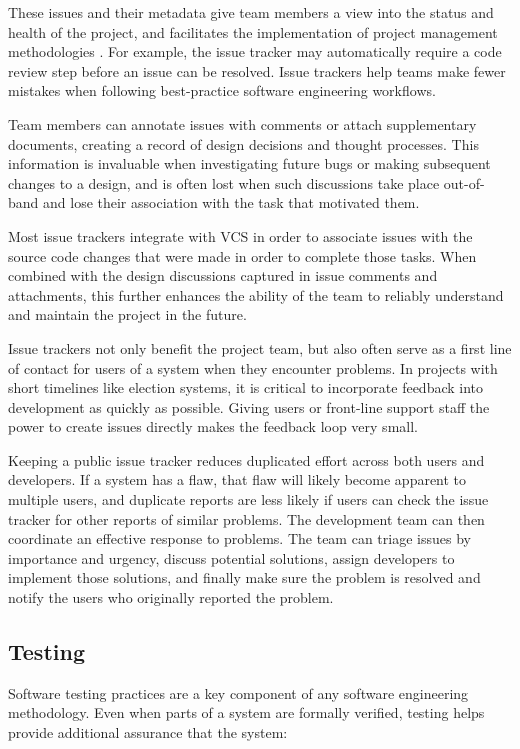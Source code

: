 These issues and their metadata give team members a view into the
status and health of the project, and facilitates the implementation
of project management methodologies . For example, the issue tracker may automatically require a
code review step before an issue can be resolved. Issue trackers help
teams make fewer mistakes when following best-practice software
engineering workflows.

Team members can annotate issues with comments or attach supplementary
documents, creating a record of design decisions and thought
processes. This information is invaluable when investigating future
bugs or making subsequent changes to a design, and is often lost when
such discussions take place out-of-band and lose their association
with the task that motivated them.

Most issue trackers integrate with VCS in order to associate issues
with the source code changes that were made in order to complete those
tasks. When combined with the design discussions captured in issue
comments and attachments, this further enhances the ability of the
team to reliably understand and maintain the project in the future.

Issue trackers not only benefit the project team, but also often serve
as a first line of contact for users of a system when they encounter
problems. In projects with short timelines like election systems, it
is critical to incorporate feedback into development as quickly as
possible. Giving users or front-line support staff the power to create
issues directly makes the feedback loop very small.

Keeping a public issue tracker reduces duplicated effort across both
users and developers. If a system has a flaw, that flaw will likely
become apparent to multiple users, and duplicate reports are less
likely if users can check the issue tracker for other reports of
similar problems. The development team can then coordinate an
effective response to problems. The team can triage issues by
importance and urgency, discuss potential solutions, assign developers
to implement those solutions, and finally make sure the problem is
resolved and notify the users who originally reported the problem.

\subsection{Testing}

Software testing practices are a key component of any software
engineering methodology. Even when parts of a system are formally
verified, testing helps provide additional assurance that the system:


